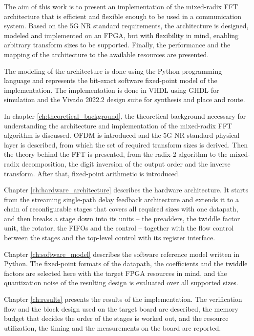 \documentclass[a4paper,12pt, master]{etf}
\begin{document}
The aim of this work is to present an implementation of the mixed-radix FFT architecture that is efficient and flexible enough to be used in a communication system. Based on the 5G NR standard requirements, the architecture is designed, modeled and implemented on an FPGA, but with flexibility in mind, enabling arbitrary transform sizes to be supported. Finally, the performance and the mapping of the architecture to the available resources are presented.

The modeling of the architecture is done using the Python programming language and represents the bit-exact software fixed-point model of the implementation. The implementation is done in VHDL using GHDL for simulation and the Vivado 2022.2 design suite for synthesis and place and route.

In chapter \ref{ch:theoretical_background}, the theoretical background necessary for understanding the architecture and implementation of the mixed-radix FFT algorithm is discussed. OFDM is introduced and the 5G NR standard physical layer is described, from which the set of required transform sizes is derived. Then the theory behind the FFT is presented, from the radix-2 algorithm to the mixed-radix decomposition, the digit inversion of the output order and the inverse transform. After that, fixed-point arithmetic is introduced.

Chapter \ref{ch:hardware_architecture} describes the hardware architecture. It starts from the streaming single-path delay feedback architecture and extends it to a chain of reconfigurable stages that covers all required sizes with one datapath, and then breaks a stage down into its units -- the preadders, the twiddle factor unit, the rotator, the FIFOs and the control -- together with the flow control between the stages and the top-level control with its register interface.

Chapter \ref{ch:software_model} describes the software reference model written in Python. The fixed-point formats of the datapath, the coefficients and the twiddle factors are selected here with the target FPGA resources in mind, and the quantization noise of the resulting design is evaluated over all supported sizes.

Chapter \ref{ch:results} presents the results of the implementation. The verification flow and the block design used on the target board are described, the memory budget that decides the order of the stages is worked out, and the resource utilization, the timing and the measurements on the board are reported.
\end{document}
